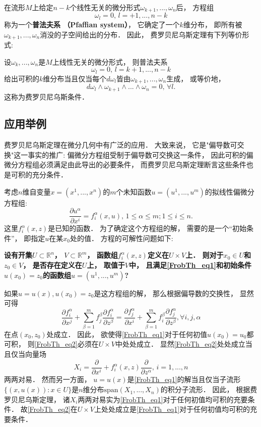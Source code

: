 在流形$M$上给定$n-k$个线性无关的微分形式$\omega_{k+1},...,\omega_{n}$后， 方程组
$$
\omega_{l}=0,\,l=+1,...,n-k
$$
称为一个\textbf{普法夫系 （Pfaffian system）}， 它确定了一个$k$维分布， 即所有被$\omega_{k+1},...,\omega_{n}$消没的子空间给出的分布． 因此， 费罗贝尼乌斯定理有下列等价形式:
\begin{theorem}{}
设$\omega_{k},...,\omega_{n}$是$M$上线性无关的微分形式， 则普法夫系
$$
\omega_{l}=0,\,l=k+1,...,n-k
$$
给出可积的$k$维分布当且仅当每个$d\omega_l$皆由$\omega_{k+1},...,\omega_{n}$生成， 或等价地，
$$
d\omega_{l}\wedge\omega_{k+1}\wedge...\wedge\omega_{n}=0,\,\forall l.
$$
这称为费罗贝尼乌斯条件．
\end{theorem}

\subsection{应用举例}
费罗贝尼乌斯定理在微分几何中有广泛的应用． 大致来说， 它是"偏导数可交换"这一事实的推广: 偏微分方程组受制于偏导数可交换这一条件， 因此可积的偏微分方程组必须满足由此导出的必要条件， 而费罗贝尼乌斯定理断言这些条件也是可积的充分条件．

考虑$n$维自变量$x=(x^1,...,x^n)$的$m$个未知函数$u=(u^1,...,u^m)$的拟线性偏微分方程组:
\begin{equation}\label{FrobTh_eq1}
\frac{\partial u^\alpha}{\partial x^i}=f_i^\alpha(x,u),\,1\leq\alpha\leq m;1\leq i\leq n.
\end{equation}
这里$f_i^\alpha(x,z)$是已知的函数． 为了确定这个方程组的解， 需要的是一个“初始条件”， 即指定$u$在某$x_0$处的值． 方程的可解性问题如下:

\textbf{设有开集$U\subset\mathbb{R}^n$， $V\subset\mathbb{R}^m$， 函数组$f_i^\alpha(x,z)$定义在$U\times V$上． 则对于$x_0\in U$和$z_0\in V$， 是否存在定义在$U$上， 取值于$V$中， 且满足\autoref{FrobTh_eq1}和初始条件$u(x_0)=z_0$的函数组$u=(u^1,...,u^m)$?}

如果$u=u(x),u(x_0)=z_0$是这方程组的解， 那么根据偏导数的交换性， 显然可得
\begin{equation}\label{FrobTh_eq2}
\frac{\partial f_i^\alpha}{\partial x^j}+\sum_{\beta=1}^mf_j^\beta\frac{\partial f_i^\alpha}{\partial z^\beta}
=\frac{\partial f_j^\alpha}{\partial x^i}+\sum_{\beta=1}^mf_i^\beta\frac{\partial f_j^\alpha}{\partial z^\beta},\forall i,j,\alpha
\end{equation}
在点$(x_0,z_0)$处成立． 因此， 欲使得\autoref{FrobTh_eq1}对于任何初值$u(x_0)=u_0$都可积， 则\autoref{FrobTh_eq2}必须在$U\times V$中处处成立． 显然\autoref{FrobTh_eq2}处处成立当且仅当向量场
$$
X_i=\frac{\partial}{\partial x^i}+f_i^\alpha(x,z)\frac{\partial}{\partial z^\alpha},\,i=1,...,n
$$
两两对易． 然而另一方面， $u=u(x)$是\autoref{FrobTh_eq1}的解当且仅当子流形$\{(x,u(x)):x\in U\}$是$n$维分布$\text{span}(X_1,...,X_n)$的积分子流形． 因此， 根据费罗贝尼乌斯定理， 诸$X_i$两两对易实为\autoref{FrobTh_eq1}对于任何初值均可积的充要条件． 故\autoref{FrobTh_eq2}在$U\times V$上处处成立是\autoref{FrobTh_eq1}对于任何初值均可积的充要条件．
